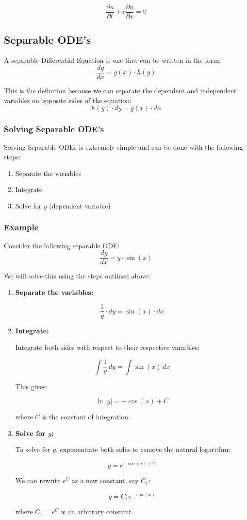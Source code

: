 \documentclass[12pt]{article}
\begin{document}
\[\frac{\partial u}{\partial t} + c \frac{\partial u}{\partial x} = 0\]
\subsection{Separable ODE's}
A separable Differential Equation is one that can be written in the form:
\[\frac{dy}{dx} = g(x) \cdot h(y)\]

This is the definition because we can separate the dependent and independent variables on opposite sides of the equation:
\[h(y) \cdot dy = g(x) \cdot dx\]

\subsubsection{Solving Separable ODE's}
Solving Separable ODEs is extremely simple and can be done with the following steps:
\begin{enumerate}
\item Separate the variables
\item Integrate
\item Solve for \(y\) (dependent variable)
\end{enumerate}

\subsubsection{Example}
Consider the following separable ODE:
\[\frac{dy}{dx} = y \cdot \sin(x)\]

We will solve this using the steps outlined above:

\begin{enumerate}
\item \textbf{Separate the variables:}

\[ \frac{1}{y} \cdot dy = \sin(x) \cdot dx \]

\item \textbf{Integrate:}

Integrate both sides with respect to their respective variables:

\[ \int \frac{1}{y} \, dy = \int \sin(x) \, dx \]

This gives:

\[ \ln|y| = -\cos(x) + C \]

where \(C\) is the constant of integration.

\item \textbf{Solve for \(y\):}

To solve for \(y\), exponentiate both sides to remove the natural logarithm:

\[ y = e^{-\cos(x) + C} \]

We can rewrite \(e^C\) as a new constant, say \(C_1\):

\[ y = C_1 e^{-\cos(x)} \]

where \(C_1 = e^C\) is an arbitrary constant.
\end{enumerate}
\end{document}
